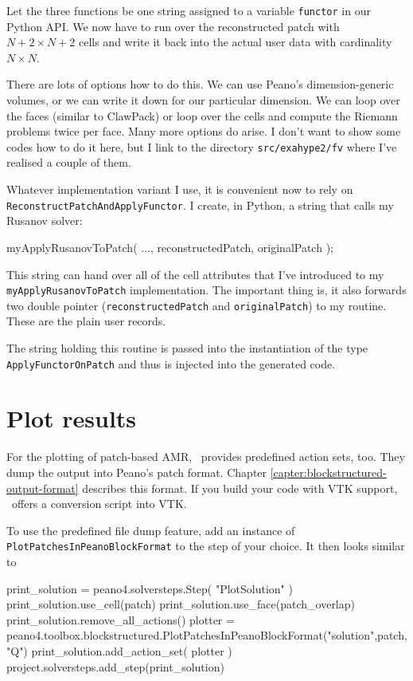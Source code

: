 \noindent
Let the three functions be one string assigned to a variable
\texttt{functor} in our Python API. 
We now have to run over the reconstructed patch with $N+2 \times N+2$ cells and
write it back into the actual user data with cardinality $N \times N$.


There are lots of options how to do this. 
We can use Peano's dimension-generic volumes, or we can write it down for our
particular dimension.
We can loop over the faces (similar to ClawPack) or loop over the cells and
compute the Riemann problems twice per face.
Many more options do arise.
I don't want to show some codes how to do it here, but I link to the directory
\texttt{src/exahype2/fv} where I've realised a couple of them.


Whatever implementation variant I use, it is convenient now to rely on
\linebreak \texttt{ReconstructPatchAndApplyFunctor}. 
I create, in Python, a string that calls my Rusanov solver: 

\begin{code}
  myApplyRusanovToPatch( ..., reconstructedPatch, originalPatch );
\end{code}

\noindent
This string can hand over all of the cell attributes that I've introduced to my
\linebreak \texttt{myApplyRusanovToPatch} implementation.
The important thing is, it also forwards two double pointer
(\texttt{reconstructedPatch} and \texttt{originalPatch}) to my routine.
These are the plain user records. 

The string holding this routine is passed into the instantiation of the type
\linebreak \texttt{ApplyFunctorOnPatch} and thus is injected into the generated code.
 
 
\section{Plot results}

For the plotting of patch-based AMR, \Peano\ provides predefined action sets,
too.
They dump the output into Peano's patch format.
Chapter \ref{capter:blockstructured-output-format} describes this format. 
If you build your code with VTK support, \Peano\ offers a conversion script into
VTK.



To use the predefined file dump feature, add an instance of \linebreak
\texttt{PlotPatchesInPeanoBlockFormat} to the step of your choice. 
It then looks similar to
\begin{code}
print_solution = peano4.solversteps.Step( "PlotSolution" )
print_solution.use_cell(patch)
print_solution.use_face(patch_overlap)
print_solution.remove_all_actions()
plotter = peano4.toolbox.blockstructured.PlotPatchesInPeanoBlockFormat("solution",patch,"Q")
print_solution.add_action_set( plotter )
project.solversteps.add_step(print_solution)
\end{code}





